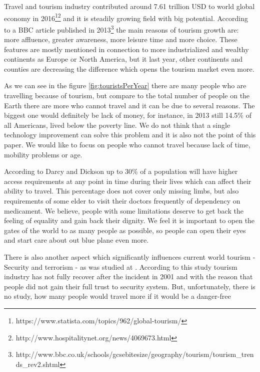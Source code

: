 Travel and tourism industry contributed around 7.61 trillion USD to world global economy in 2016\footnote{https://www.statista.com/topics/962/global-tourism/}\footnote{http://www.hospitalitynet.org/news/4069673.html} and it is steadily growing field with big potential. According to a BBC article published in 2013\footnote{http://www.bbc.co.uk/schools/gcsebitesize/geography\newline/tourism/tourism\_trends\_rev2.shtml} the main reasons of tourism growth are: more affluence, greater awareness, more leisure time and more choice. These features are mostly mentioned in connection to more industrialized and wealthy continents as Europe or North America, but it last year, other continents and counties are decreasing the difference which opens the tourism market even more.

As we can see in the figure \ref{fig:touristsPerYear} there are many people who are travelling because of tourism, but compare to the total number of people on the Earth there are more who cannot travel and it can be due to several reasons. The biggest one would definitely be lack of money, for instance, in 2013 still 14.5\% of all Americans, lived below the poverty line. We do not think that a single technology improvement can solve this problem and it is also not the point of this paper. We would like to focus on people who cannot travel because lack of time, mobility problems or age.

According to Darcy and Dickson\cite{darcy2009whole} up to 30\% of a population will have higher access requirements at any point in time during their lives which can affect their ability to travel. This percentage does not cover only missing limbs, but also requirements of some elder to visit their doctors frequently of dependency on medicament. We believe, people with some limitations deserve to get back the feeling of equality and gain back their dignity. We feel it is important to open the gates of the world to as many people as possible, so people can open their eyes and start care about out blue plane even more. 

There is also another aspect which significantly influences current world tourism - Security and terrorism - as was studied at \cite{bac2015terrorism}. According to this study tourism industry has not fully recover after the incident in 2001 and with the reason that people did not gain their full trust to security system. But, unfortunately, there is no study, how many people would travel more if it would be a danger-free


